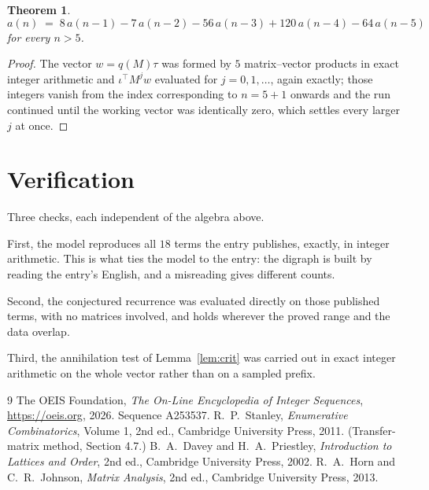 \documentclass[11pt,a4paper]{article}
\theoremstyle{plain}
\newtheorem{theorem}{Theorem}
\theoremstyle{definition}
\begin{document}
\begin{theorem}
\[
a(n)\;=\;8\,a(n-1) - 7\,a(n-2) - 56\,a(n-3) + 120\,a(n-4) - 64\,a(n-5)
\]
for every $n>5$.
\end{theorem}

\begin{proof}
The vector $w=q(M)\tau$ was formed by $5$ matrix--vector products in exact integer
arithmetic and $\iota^{\!\top}M^{j}w$ evaluated for $j=0,1,\dots$, again exactly; those
integers vanish from the index corresponding to $n=5+1$ onwards and the run continued
until the working vector was identically zero, which settles every larger $j$ at once.
\end{proof}

\section{Verification}

Three checks, each independent of the algebra above.

First, the model reproduces all $18$ terms the entry publishes, exactly, in integer
arithmetic. This is what ties the model to the entry: the digraph is built by reading the
entry's English, and a misreading gives different counts.

Second, the conjectured recurrence was evaluated directly on those published terms, with no
matrices involved, and holds wherever the proved range and the data overlap.

Third, the annihilation test of Lemma~\ref{lem:crit} was carried out in exact integer
arithmetic on the whole vector rather than on a sampled prefix.

\begin{thebibliography}{9}
 The OEIS Foundation, \emph{The On-Line Encyclopedia of Integer
Sequences}, \url{https://oeis.org}, 2026. Sequence A253537.
 R.~P.~Stanley, \emph{Enumerative Combinatorics}, Volume 1, 2nd ed.,
Cambridge University Press, 2011. (Transfer-matrix method, Section 4.7.)
 B.~A.~Davey and H.~A.~Priestley, \emph{Introduction to Lattices and
Order}, 2nd ed., Cambridge University Press, 2002.
 R.~A.~Horn and C.~R.~Johnson, \emph{Matrix Analysis}, 2nd ed., Cambridge
University Press, 2013.
\end{thebibliography}
\end{document}
